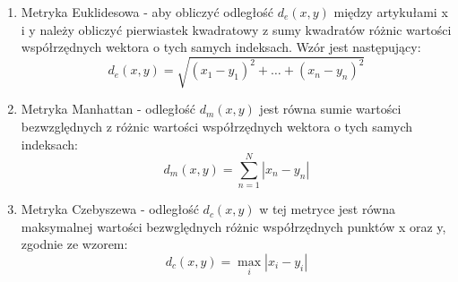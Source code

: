 \documentclass{classrep}
\let\bbordermatrix\bordermatrix
\begin{document}
\begin{enumerate}
\item Metryka Euklidesowa - aby obliczyć odległość $d_e(x,y)$ między artykułami x i y należy obliczyć pierwiastek kwadratowy z sumy kwadratów różnic wartości współrzędnych wektora o tych samych indeksach. Wzór jest następujący:
\begin{equation} 
d_e(x,y)=\sqrt{(x_1-y_1)^2+\ldots+(x_n-y_n)^2}
\end{equation}
\item Metryka Manhattan - odległość $d_m(x,y)$ jest równa sumie wartości bezwzględnych z różnic wartości współrzędnych wektora o tych samych indeksach:
\begin{equation} 
d_m(x,y)=\sum_{n=1}^{N} |{x_n-y_n}|
\end{equation}
\item Metryka Czebyszewa - odległość $d_c(x,y)$ w tej metryce jest równa maksymalnej wartości bezwględnych różnic współrzędnych punktów x oraz y, zgodnie ze wzorem:
\begin{equation} 
d_c(x,y)=\max_{i} |{x_i-y_i}|
\end{equation}


\end{enumerate}
\end{document}
